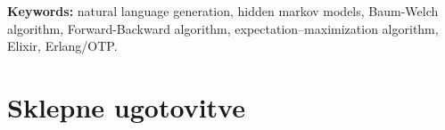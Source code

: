 \documentclass[a4paper, 12pt]{book}
\newcommand{\tkeywordsEn}{natural language generation, hidden markov models,
Baum-Welch algorithm, Forward-Backward algorithm, expectation–maximization
algorithm, Elixir, Erlang/OTP}
\newcommand{\clearemptydoublepage}{\newpage{\pagestyle{empty}\cleardoublepage}}
\begin{document}
\noindent\textbf{Keywords:} \tkeywordsEn.
\clearemptydoublepage

\mainmatter
\setcounter{page}{1}
\pagestyle{fancy}








\chapter{Sklepne ugotovitve}


\label{ch:literatura}

\end{document}
